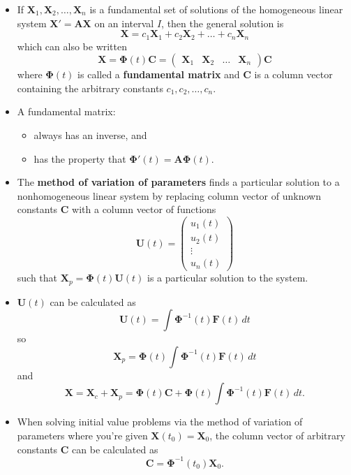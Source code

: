 \documentclass{article}
\begin{document}
\begin{itemize}
  \item If $\mathbf{X}_1, \mathbf{X}_2, \ldots, \mathbf{X}_n$ is a fundamental set of solutions of the homogeneous linear system $\mathbf{X' = A X}$ on an interval $I$, then the general solution is \[\mathbf{X} = c_1 \mathbf{X}_1 + c_2 \mathbf{X}_2 + \ldots + c_n \mathbf{X}_n\] which can also be written \[\mathbf{X} = \mathbf{\Phi}(t) \mathbf{C} = \begin{pmatrix}
            \mathbf{X}_1 & \mathbf{X}_2 & \ldots & \mathbf{X}_n
          \end{pmatrix} \mathbf{C}\] where $\mathbf{\Phi}(t)$ is called a \textbf{fundamental matrix} and $\mathbf{C}$ is a column vector containing the arbitrary constants $c_1, c_2, \ldots, c_n$.

  \item A fundamental matrix:

        \begin{itemize}
          \item always has an inverse, and

          \item has the property that $\mathbf{\Phi}'(t) = \mathbf{A} \mathbf{\Phi}(t).$
        \end{itemize}

  \item The \textbf{method of variation of parameters} finds a particular solution to a nonhomogeneous linear system by replacing column vector of unknown constants $\mathbf{C}$ with a column vector of functions \[\mathbf{U}(t) = \begin{pmatrix}
            u_1(t) \\
            u_2(t) \\
            \vdots \\
            u_n(t)
          \end{pmatrix}\] such that $\mathbf{X}_p = \mathbf{\Phi}(t) \mathbf{U}(t)$ is a particular solution to the system.

  \item $\mathbf{U}(t)$ can be calculated as \[\mathbf{U}(t) = \int \mathbf{\Phi}^{-1}(t) \mathbf{F}(t) \,dt\] so \[\mathbf{X}_p = \mathbf{\Phi}(t) \int \mathbf{\Phi}^{-1}(t) \mathbf{F}(t) \,dt\] and \[\mathbf{X} = \mathbf{X}_c + \mathbf{X}_p = \mathbf{\Phi}(t) \mathbf{C} + \mathbf{\Phi}(t) \int \mathbf{\Phi}^{-1}(t) \mathbf{F}(t) \,dt.\]

  \item When solving initial value problems via the method of variation of parameters where you're given $\mathbf{X}(t_0) = \mathbf{X}_0$, the column vector of arbitrary constants $\mathbf{C}$ can be calculated as \[\mathbf{C} = \mathbf{\Phi}^{-1}(t_0) \mathbf{X}_0.\]
\end{itemize}
\end{document}
